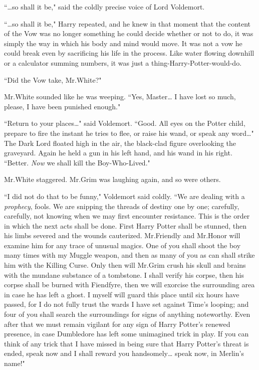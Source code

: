 ``{\ldots}so shall it be," said the coldly precise voice of Lord Voldemort.

``{\ldots}so shall it be," Harry repeated, and he knew in that moment that the content of the Vow was no longer something he could decide whether or not to do, it was simply the way in which his body and mind would move. It was not a vow he could break even by sacrificing his life in the process. Like water flowing downhill or a calculator summing numbers, it was just a thing-Harry-Potter-would-do.

``Did the Vow take, Mr.\?White?"

Mr.\?White sounded like he was weeping. ``Yes, Master{\ldots} I have lost so much, please, I have been punished enough."

``Return to your places{\ldots}" said Voldemort. ``Good. All eyes on the Potter child, prepare to fire the instant he tries to flee, or raise his wand, or speak any word{\ldots}" The Dark Lord floated high in the air, the black-clad figure overlooking the graveyard. Again he held a gun in his left hand, and his wand in his right. ``Better. \emph{Now} we shall kill the Boy-Who-Lived."

Mr.\?White staggered. Mr.\?Grim was laughing again, and so were others.

``I did not do that to be funny," Voldemort said coldly. ``We are dealing with a \emph{prophecy}, fools. We are snipping the threads of destiny one by one; carefully, carefully, not knowing when we may first encounter resistance. This is the order in which the next acts shall be done. First Harry Potter shall be stunned, then his limbs severed and the wounds cauterized. Mr.\?Friendly and Mr.\?Honor will examine him for any trace of unusual magics. One of you shall shoot the boy many times with my Muggle weapon, and then as many of you as can shall strike him with the Killing Curse. Only then will Mr.\?Grim crush his skull and brains with the mundane substance of a tombstone. I shall verify his corpse, then his corpse shall be burned with Fiendfyre, then we will exorcise the surrounding area in case he has left a ghost. I myself will guard this place until six hours have passed, for I do not fully trust the wards I have set against Time's looping; and four of you shall search the surroundings for signs of anything noteworthy. Even after that we must remain vigilant for any sign of Harry Potter's renewed presence, in case Dumbledore has left some unimagined trick in play. If you can think of any trick that I have missed in being sure that Harry Potter's threat is ended, speak now and I shall reward you handsomely{\ldots} speak now, in Merlin's name!"

